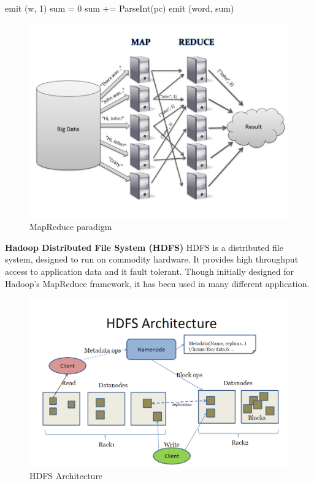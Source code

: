 \documentclass[english]{tktltiki}
\begin{document}
\begin{algorithm}
\begin{algorithmic}
      		\State emit (w, 1)
   \EndFor
\EndFunction
\State 
{}
  \State sum = 0
    \State sum += ParseInt(pc)
    \State emit (word, sum)
\EndFor
\EndFunction
\end{algorithmic}
\end{algorithm}

\begin{figure}[ht!]
\centering
\includegraphics[width=130mm]{figures/mapreduce.jpg}
\caption{MapReduce paradigm}
\end{figure}

\textbf{Hadoop Distributed File System (HDFS)}
HDFS is a distributed file system, designed to run on commodity hardware. It provides high throughput access to application data and it fault tolerant. Though initially designed for Hadoop's MapReduce framework, it has been used in many different application.
\begin{figure}[ht!]
\centering
\includegraphics[width=130mm]{figures/hdfsarchitecture.png}
\caption{HDFS Architecture}
\end{figure}
\end{document}
